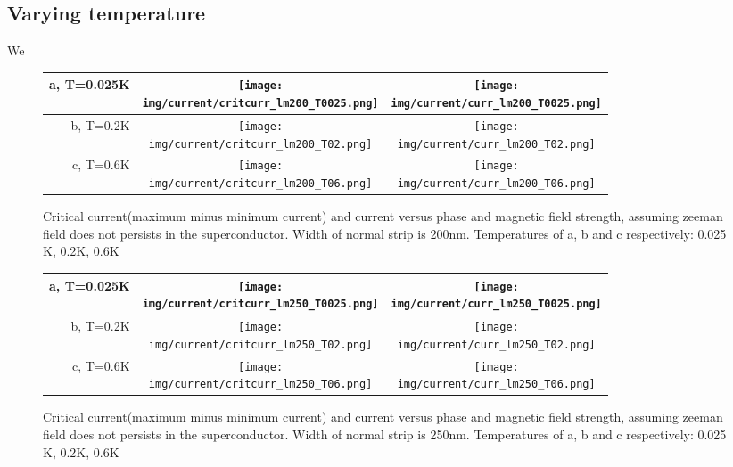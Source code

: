 \documentclass[10pt,a4paper]{article}
\newcommand{\img}{./images}
\begin{document}
	\subsection{Varying temperature}
	We 
		\begin{figure}[H]
			\begin{tabular}{rcc}
				a, T=0.025K&\texttt{[image: \\img/current/critcurr\_lm200\_T0025.png]}&
				\texttt{[image: \\img/current/curr\_lm200\_T0025.png]}\\
				\hline
				b, T=0.2K&\texttt{[image: \\img/current/critcurr\_lm200\_T02.png]}&
				\texttt{[image: \\img/current/curr\_lm200\_T02.png]}\\
				\hline
				c, T=0.6K&\texttt{[image: \\img/current/critcurr\_lm200\_T06.png]}&
				\texttt{[image: \\img/current/curr\_lm200\_T06.png]}\\
				\hline
			\end{tabular}
			\caption{Critical current(maximum minus minimum current) and current versus phase and magnetic field strength, assuming zeeman field does not persists in the superconductor. Width of normal strip is 200nm. Temperatures of a, b and c respectively: 0.025 K, 0.2K, 0.6K}
		\end{figure}
	
		\begin{figure}[H]
			\begin{tabular}{rcc}
				a, T=0.025K&\texttt{[image: \\img/current/critcurr\_lm250\_T0025.png]}&
				\texttt{[image: \\img/current/curr\_lm250\_T0025.png]}\\
				\hline
				b, T=0.2K&\texttt{[image: \\img/current/critcurr\_lm250\_T02.png]}&
				\texttt{[image: \\img/current/curr\_lm250\_T02.png]}\\
				\hline
				c, T=0.6K&\texttt{[image: \\img/current/critcurr\_lm250\_T06.png]}&
				\texttt{[image: \\img/current/curr\_lm250\_T06.png]}\\
				\hline
			\end{tabular}
			\caption{Critical current(maximum minus minimum current) and current versus phase and magnetic field strength, assuming zeeman field does not persists in the superconductor. Width of normal strip is 250nm. Temperatures of a, b and c respectively: 0.025 K, 0.2K, 0.6K}
		\end{figure}
\clearpage
\printglossaries
\end{document}
